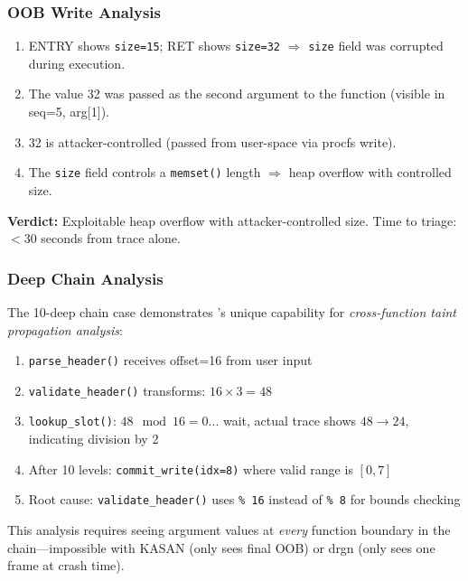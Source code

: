 \documentclass{ndss}
\begin{document}
\subsubsection{OOB Write Analysis}

\begin{enumerate}[nosep]
  \item ENTRY shows \texttt{size=15}; RET shows \texttt{size=32} $\Rightarrow$
        \texttt{size} field was corrupted during execution.
  \item The value 32 was passed as the second argument to the function
        (visible in seq=5, arg[1]).
  \item 32 is attacker-controlled (passed from user-space via procfs write).
  \item The \texttt{size} field controls a \texttt{memset()} length
        $\Rightarrow$ heap overflow with controlled size.
\end{enumerate}

\textbf{Verdict:} Exploitable heap overflow with attacker-controlled size.
Time to triage: $<$30 seconds from trace alone.

\subsubsection{Deep Chain Analysis}

The 10-deep chain case demonstrates \toolname{}'s unique capability for
\emph{cross-function taint propagation analysis}:

\begin{enumerate}[nosep]
  \item \texttt{parse\_header()} receives offset=16 from user input
  \item \texttt{validate\_header()} transforms: $16 \times 3 = 48$
  \item \texttt{lookup\_slot()}: $48 \mod 16 = 0$... wait, actual trace shows
        $48 \to 24$, indicating division by 2
  \item After 10 levels: \texttt{commit\_write(idx=8)} where valid range is
        $[0, 7]$
  \item Root cause: \texttt{validate\_header()} uses \texttt{\% 16} instead of
        \texttt{\% 8} for bounds checking
\end{enumerate}

This analysis requires seeing argument values at \emph{every} function boundary
in the chain---impossible with KASAN (only sees final OOB) or drgn (only sees
one frame at crash time).
\end{document}
